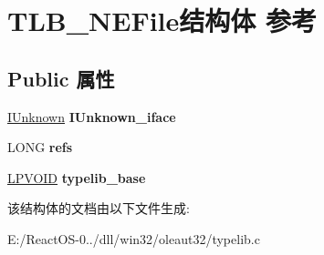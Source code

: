 \hypertarget{struct_t_l_b___n_e_file}{}\section{T\+L\+B\+\_\+\+N\+E\+File结构体 参考}
\label{struct_t_l_b___n_e_file}
\subsection*{Public 属性}
\begin{DoxyCompactItemize}
\item 
\mbox{\label{struct_t_l_b___n_e_file_a9d3b0d49e6046076eb35ef4424d24aa1}} 
\hyperlink{interface_i_unknown}{I\+Unknown} {\bfseries I\+Unknown\+\_\+iface}
\item 
\mbox{\label{struct_t_l_b___n_e_file_adcb1744e9a23ed410570e4b56b513252}} 
L\+O\+NG {\bfseries refs}
\item 
\mbox{\label{struct_t_l_b___n_e_file_aade4c51fa865a4131cfcd9986e78f1b3}} 
\hyperlink{interfacevoid}{L\+P\+V\+O\+ID} {\bfseries typelib\+\_\+base}
\end{DoxyCompactItemize}


该结构体的文档由以下文件生成\+:\begin{DoxyCompactItemize}
\item 
E\+:/\+React\+O\+S-\/0../dll/win32/oleaut32/typelib.\+c\end{DoxyCompactItemize}
